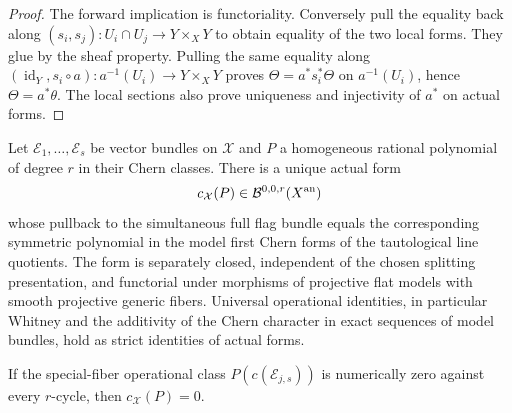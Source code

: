 \begin{proof}
The forward implication is functoriality.  Conversely pull the equality
back along $(s_i,s_j):U_i\cap U_j\to Y\times_XY$ to obtain equality
of the two local forms.  They glue by the sheaf property.  Pulling the
same equality along
$(\operatorname{id}_Y,s_i\circ a):a^{-1}(U_i)\to Y\times_XY$ proves
$\Theta=a^*s_i^*\Theta$ on $a^{-1}(U_i)$, hence $\Theta=a^*\theta$.
The local sections also prove uniqueness and injectivity of $a^*$ on
actual forms.  
\end{proof}

\begin{theorem}
\label{r10c:chern}
Let $\mathcal E_1,\ldots,\mathcal E_s$ be vector bundles on
$\mathcal X$ and $P$ a homogeneous rational polynomial of degree $r$
in their Chern classes.  There is a unique actual form
\[
              c_{\mathcal X}(P)\in\mathcal B^{0,0,r}(X^{\rm an})
\]
whose pullback to the simultaneous full flag bundle equals the
corresponding symmetric polynomial in the model first Chern forms of
the tautological line quotients.  The form is separately closed,
independent of the chosen splitting presentation, and functorial under
morphisms of projective flat models with smooth projective generic
fibers.  Universal operational identities, in particular Whitney and
the additivity of the Chern character in exact sequences of model
bundles, hold as strict identities of actual forms.

If the special-fiber operational class $P(c(\mathcal E_{j,s}))$ is
numerically zero against every $r$-cycle, then $c_{\mathcal X}(P)=0$.
\end{theorem}

